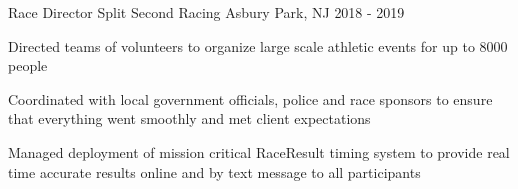 
\begin{cventries}
  \cventry
    {Race Director} %
    {Split Second Racing} %
    {Asbury Park, NJ} %
    {2018 - 2019} %
    {
      \begin{cvitems} %
        \item {Directed teams of volunteers to organize large scale athletic events for up to 8000 people}
		\item {Coordinated with local government officials, police and race sponsors to ensure that everything went smoothly and met client expectations}
		\item {Managed deployment of mission critical RaceResult timing system to provide real time accurate results online and by text message to all participants}
      \end{cvitems}
    }


\end{cventries}
